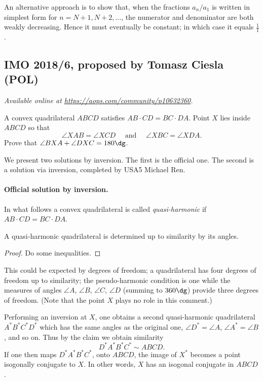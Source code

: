 \documentclass[11pt]{scrartcl}
\begin{document}
\begin{remark*}
  An alternative approach is to show that, when the fractions $a_n / a_1$
  is written in simplest form for $n = N+1, N+2, \dots$,
  the numerator and denominator are both weakly decreasing.
  Hence it must eventually be constant; in which case it equals $\frac11$.
\end{remark*}
\pagebreak

\subsection{IMO 2018/6, proposed by Tomasz Ciesla (POL)}
\textsl{Available online at \url{https://aops.com/community/p10632360}.}
\begin{mdframed}[style=mdpurplebox,frametitle={Problem statement}]
A convex quadrilateral $ABCD$ satisfies $AB \cdot CD = BC \cdot DA$.
Point $X$ lies inside $ABCD$ so that
\[ \angle XAB=\angle XCD \quad \text{ and } \quad \angle XBC=\angle XDA. \]
Prove that $\angle BXA + \angle DXC=180\dg$.
\end{mdframed}
We present two solutions by inversion.
The first is the official one.
The second is a solution via inversion, completed by USA5 Michael Ren.

\paragraph{Official solution by inversion.}
In what follows a convex quadrilateral is called
\emph{quasi-harmonic} if $AB \cdot CD = BC \cdot DA$.

\begin{claim*}
  A quasi-harmonic quadrilateral is determined
  up to similarity by its angles.
\end{claim*}
\begin{proof}
  Do some inequalities.
\end{proof}
\begin{remark*}
  This could be expected by degrees of freedom;
  a quadrilateral has four degrees of freedom up to similarity;
  the pseudo-harmonic condition is one
  while the measures of angles $\angle A$, $\angle B$, $\angle C$, $\angle D$
  (summing to $360\dg$) provide three degrees of freedom.
  (Note that the point $X$ plays no role in this comment.)
\end{remark*}

Performing an inversion at $X$, one obtains a
second quasi-harmonic quadrilateral
$A^\ast B^\ast C^\ast D^\ast$ which has the same angles
as the original one, $\angle D^\ast = \angle A$,
$\angle A^\ast = \angle B$, and so on.
Thus by the claim we obtain similarity
\[ D^\ast A^\ast B^\ast C^\ast \sim ABCD. \]
If one then maps $D^\ast A^\ast B^\ast C^\ast$,
onto $ABCD$, the image of $X^\ast$
becomes a point isogonally conjugate to $X$.
In other words, $X$ has an isogonal conjugate in $ABCD$.
\end{document}
